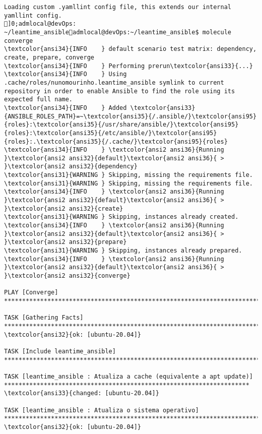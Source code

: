 \documentclass{scrartcl}
\begin{document}
\begin{Verbatim}
Loading custom .yamllint config file, this extends our internal yamllint config.
]0;admlocal@devOps: ~/leantime_ansibleadmlocal@devOps:~/leantime_ansible$ molecule converge
\textcolor{ansi34}{INFO    } default scenario test matrix: dependency, create, prepare, converge
\textcolor{ansi34}{INFO    } Performing prerun\textcolor{ansi33}{...}
\textcolor{ansi34}{INFO    } Using .cache/roles/nunomourinho.leantime_ansible symlink to current repository in order to enable Ansible to find the role using its expected full name.
\textcolor{ansi34}{INFO    } Added \textcolor{ansi33}{ANSIBLE_ROLES_PATH}=~\textcolor{ansi35}{/.ansible/}\textcolor{ansi95}{roles}:\textcolor{ansi35}{/usr/share/ansible/}\textcolor{ansi95}{roles}:\textcolor{ansi35}{/etc/ansible/}\textcolor{ansi95}{roles}:.\textcolor{ansi35}{/.cache/}\textcolor{ansi95}{roles}
\textcolor{ansi34}{INFO    } \textcolor{ansi2 ansi36}{Running }\textcolor{ansi2 ansi32}{default}\textcolor{ansi2 ansi36}{ > }\textcolor{ansi2 ansi32}{dependency}
\textcolor{ansi31}{WARNING } Skipping, missing the requirements file.
\textcolor{ansi31}{WARNING } Skipping, missing the requirements file.
\textcolor{ansi34}{INFO    } \textcolor{ansi2 ansi36}{Running }\textcolor{ansi2 ansi32}{default}\textcolor{ansi2 ansi36}{ > }\textcolor{ansi2 ansi32}{create}
\textcolor{ansi31}{WARNING } Skipping, instances already created.
\textcolor{ansi34}{INFO    } \textcolor{ansi2 ansi36}{Running }\textcolor{ansi2 ansi32}{default}\textcolor{ansi2 ansi36}{ > }\textcolor{ansi2 ansi32}{prepare}
\textcolor{ansi31}{WARNING } Skipping, instances already prepared.
\textcolor{ansi34}{INFO    } \textcolor{ansi2 ansi36}{Running }\textcolor{ansi2 ansi32}{default}\textcolor{ansi2 ansi36}{ > }\textcolor{ansi2 ansi32}{converge}

PLAY [Converge] **************************************************************************************************************************

TASK [Gathering Facts] *******************************************************************************************************************
\textcolor{ansi32}{ok: [ubuntu-20.04]}

TASK [Include leantime_ansible] **********************************************************************************************************

TASK [leantime_ansible : Atualiza a cache (equivalente a apt update)] ********************************************************************
\textcolor{ansi33}{changed: [ubuntu-20.04]}

TASK [leantime_ansible : Atualiza o sistema operativo] ***********************************************************************************
\textcolor{ansi32}{ok: [ubuntu-20.04]}


\end{Verbatim}
\end{document}
